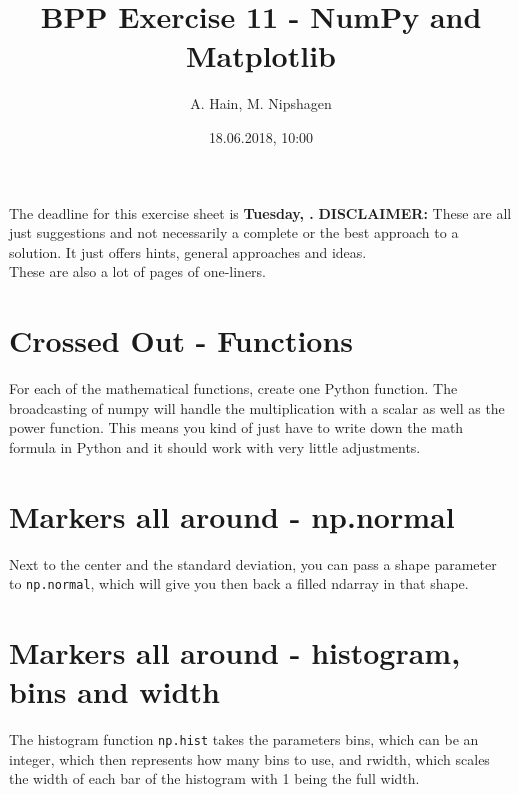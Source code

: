 

\title{BPP Exercise 11 - NumPy and Matplotlib}
\author{A. Hain, M. Nipshagen}
\date{18.06.2018, 10:00}

\makeatletter
\let\thetitle\@title
\let\theauthor\@author
\let\thedate\@date
\makeatother

\newcommand\itemsub[1]{
	\begin{itemize}
		\item #1
	\end{itemize}
}

\setcounter{secnumdepth}{0}


The deadline for this exercise sheet is \textbf{Tuesday, \thedate.}
\tableofcontents
\vspace{12pt}\noindent
\textbf{DISCLAIMER:} These are all just suggestions and not necessarily a complete
or the best approach to a solution. It just offers hints, general approaches
and ideas.\\
These are also a lot of pages of one-liners.
\pagebreak

\section{Crossed Out - Functions}
For each of the mathematical functions, create one Python function. The broadcasting
of numpy will handle the multiplication with a scalar as well as the power function.
This means you kind of just have to write down the math formula in Python and it 
should work with very little adjustments.

\pagebreak

\section{Markers all around - np.normal}
Next to the center and the standard deviation, you can pass a shape parameter to
\verb|np.normal|, which will give you then back a filled ndarray in that shape.

\pagebreak

\section{Markers all around - histogram, bins and width}
The histogram function \verb|np.hist| takes the parameters bins, which can be 
an integer, which then represents how many bins to use, and rwidth, which scales
the width of each bar of the histogram with 1 being the full width. 

